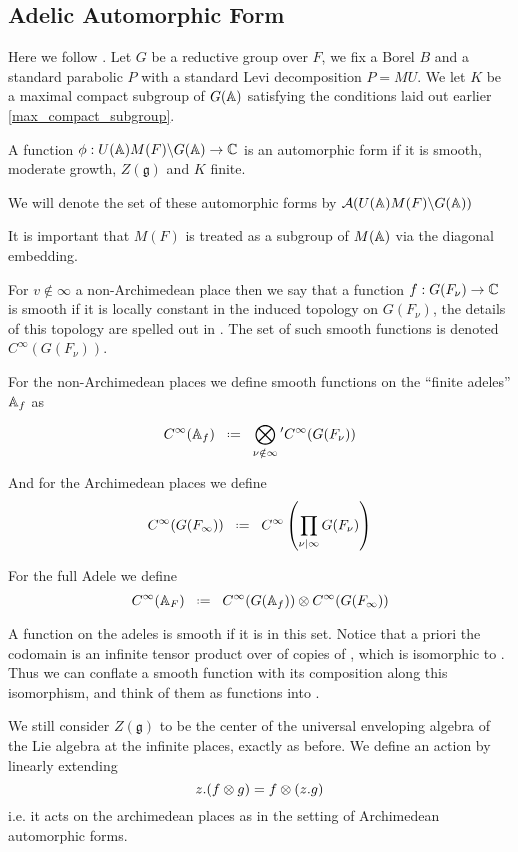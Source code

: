 \subsection{Adelic Automorphic Form}
Here we follow \cite[I.2.17]{moeglinSpectralDecompositionEisenstein1995}. Let \(G\) be a reductive group over \(F\), we fix a Borel \(B\) and a standard parabolic \(P \) with a standard Levi decomposition \(P = MU\). We let \(K\) be a maximal compact subgroup of \(G(\A)\) satisfying the conditions laid out earlier \ref{max_compact_subgroup}.
\begin{definition}
    A function \(\phi: U(\A)M(F)\backslash G(\A) \to \C\) is an automorphic form if it is smooth, moderate growth, \(Z(\mathfrak{g})\) and \(K\) finite. 

	We will denote the set of these automorphic forms by \(\mathcal{A}(U(\A)M(F)\backslash G(\A))\)
\end{definition}

\begin{remark}
    It is important that \(M(F)\) is treated as a subgroup of \(M(\A)\) via the diagonal embedding.
\end{remark}

For \(v\notin \infty\) a non-Archimedean place then we say that a function \(f: G(F_\nu) \to \C\) is smooth if it is locally constant in the induced topology on \(G(F_\nu)\), the details of this topology are spelled out in \cite{conradWeilGrothendieckApproaches2012}. The set of such smooth functions is denoted \(C^\infty(G(F_\nu))\).
	
	For the non-Archimedean places we define smooth functions on the ``finite adeles'' \(\A_f\) as 
	\[C^\infty(\mathbb{A}_f) \defeq \bigotimes^{}_{\nu \notin \infty} \phantom{}' C^\infty(G(F_\nu)) \]
	
	And for the Archimedean places we define
	\[C^\infty(G(F_\infty)) \defeq C^\infty\left(\prod_{\nu|\infty} G(F_\nu)\right)\]
	
	For the full Adele we define 
	\[C^\infty(\mathbb{A}_F) \defeq   C^\infty(G(\mathbb{A}_f))   \otimes   C^\infty(G(F_\infty))\]
	
	A function on the adeles is smooth if it is in this set. Notice that a priori the codomain is an infinite tensor product over \C of copies of \C, which is isomorphic to \C. Thus we can conflate a smooth function with its composition along this isomorphism, and think of them as functions into \C.

    We still consider \(Z(\mathfrak{g})\) to be the center of the universal enveloping algebra of the Lie algebra at the infinite places, exactly as before. We define an action by linearly extending
    \[z.(f\otimes g) = f\otimes (z.g)\]
    i.e. it acts on the archimedean places as in the setting of Archimedean automorphic forms. 
	
